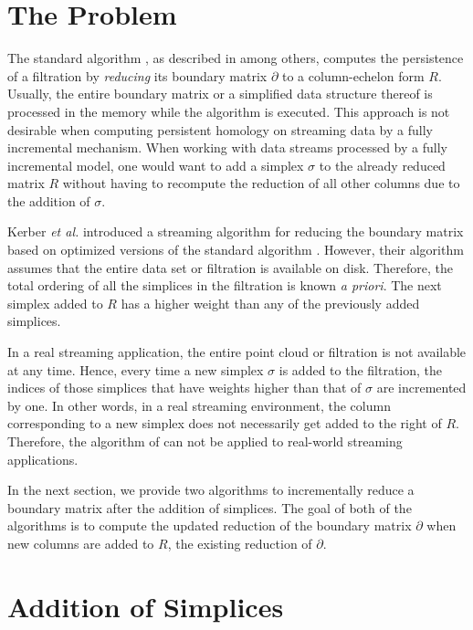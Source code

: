 \documentclass[11pt]{article}
\begin{document}
\section{The Problem}


The standard algorithm \cite{edelsbrunner-00, zomorodian-05}, as described in 
\cite{edelsbrunner-10, otter-17, chen-11, kerber-18} among others, computes the persistence of a 
filtration \cite{zomorodian-10} by \emph{reducing} its boundary matrix $\partial$ to a 
column-echelon form $R$.  Usually, the entire boundary matrix or a simplified data structure 
thereof is processed in the memory while the algorithm is executed.  This approach is not desirable 
when computing persistent homology on streaming data by a fully incremental mechanism.  When 
working with data streams processed by a fully incremental model, one would want to add a simplex 
$\sigma$ to the already reduced matrix $R$ without having to recompute the reduction of all other 
columns due to the addition of $\sigma$.


Kerber \emph{et al.} \cite{kerber-18} introduced a streaming algorithm for reducing the boundary 
matrix based on optimized versions of the standard algorithm \cite{edelsbrunner-00, 
zomorodian-05}.  However, their algorithm assumes that the entire data set or filtration is 
available on disk.  Therefore, the total ordering of all the simplices in the filtration is known 
\emph{a priori}.  The next simplex added to $R$ has a higher weight than any of the previously 
added simplices.


In a real streaming application, the entire point cloud or filtration is not available at any 
time.  Hence, every time a new simplex $\sigma$ is added to the filtration, the indices of those 
simplices that have weights higher than that of $\sigma$ are incremented by one.  In other words, 
in a real streaming environment, the column corresponding to a new simplex does not necessarily get 
added to the right of $R$.  Therefore, the algorithm of \cite{kerber-18} can not be applied to 
real-world streaming applications.


In the next section, we provide two algorithms to incrementally reduce a boundary matrix after the 
addition of simplices.  The goal of both of the algorithms is to compute the updated reduction of 
the boundary matrix $\partial$ when new columns are added to $R$, the existing reduction of 
$\partial$.



\section{Addition of Simplices}
\end{document}
